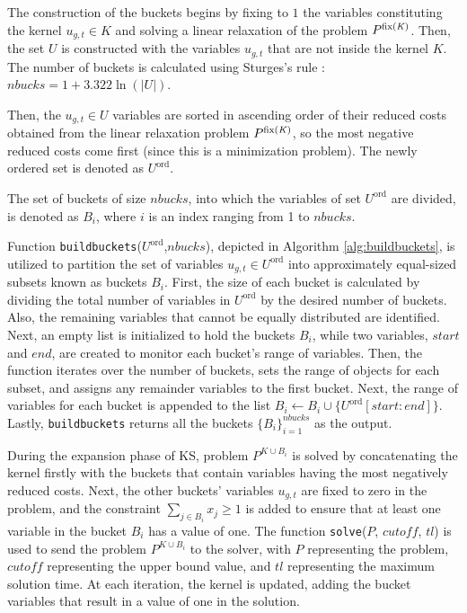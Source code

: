 

The construction of the buckets begins by fixing to $1$ the variables constituting the kernel $u_{g,t} \in K$ and solving a linear relaxation of the problem $P^\text{fix(\textit{K})}$.
Then, the set $U$ is constructed with the variables $u_{g,t}$ that are not inside the kernel $K$.
The number of buckets is calculated using Sturges's rule \citep{Scott2009}: $\textit{nbucks}=1+3.322 \ln(|U|)$.

Then, the $u_{g,t}\in U$ variables are sorted in ascending order of their reduced costs obtained from the linear relaxation problem $P^\text{fix(\textit{K})}$, so the most negative reduced costs come first (since this is a minimization problem). The newly ordered set is denoted as $U^{\text{ord}}$.

The set of buckets of size $\textit{nbucks}$, into which the variables of set $U^{\text{ord}}$ are divided, is denoted as $B_i$, where $i$ is an index ranging from 1 to $\textit{nbucks}$.



Function \texttt{buildbuckets}($U^{\text{ord}}$,$\textit{nbucks}$), depicted in Algorithm \ref{alg:buildbuckets}, is utilized to partition the set of variables $u_{g,t}\in U^{\text{ord}}$ into approximately equal-sized subsets known as buckets $B_i$. First, the size of each bucket is calculated by dividing the total number of variables in $U^{\text{ord}}$ by the desired number of buckets. Also, the remaining variables that cannot be equally distributed are identified. Next, an empty list is initialized to hold the buckets $B_i$, while two variables, $\textit{start}$ and $\textit{end}$, are created to monitor each bucket's range of variables. Then, the function iterates over the number of buckets, sets the range of objects for each subset, and assigns any remainder variables to the first bucket. Next, the range of variables for each bucket is appended to the list $ B_i\leftarrow  B_i\cup \lbrace U^{\text{ord}}[\textit{start}:\textit{end}]\rbrace$. Lastly, \texttt{buildbuckets} returns all the buckets $\{ B_i\}_{i=1}^{\textit{nbucks}}$ as the output.

During the expansion phase of KS, problem $P^{K \cup B_i}$ is solved by concatenating the kernel firstly with the buckets that contain variables having the most negatively reduced costs.
Next, the other buckets' variables $u_{g,t}$ are fixed to zero in the problem, and the constraint $\sum_{j\in B_{i}}x_{j} \geq 1$ is added to ensure that at least one variable in the bucket $B_i$ has a value of one.
The function \texttt{solve}($P$, $\textit{cutoff}$, $\textit{tl}$) is used to send the problem $P^{K\cup B_i}$ to the solver, with $P$ representing the problem, $\textit{cutoff}$ representing the upper bound value, and $tl$ representing the maximum solution time. At each iteration, the kernel is updated, adding the bucket variables that result in a value of one in the solution.

